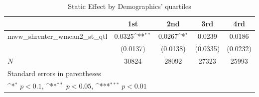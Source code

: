 \begin{table}[htbp]\centering
\def\sym#1{\ifmmode^{#1}\else\(^{#1}\)\fi}
\caption{Static Effect by Demographics' quartiles}
\begin{tabular}{l*{4}{c}}
\hline\hline
            &\multicolumn{1}{c}{1st}&\multicolumn{1}{c}{2nd}&\multicolumn{1}{c}{3rd}&\multicolumn{1}{c}{4rd}\\
\hline
mww\_shrenter\_wmean2\_st\_qtl&      0.0325\sym{**} &      0.0267\sym{*}  &      0.0239         &      0.0186         \\
            &    (0.0137)         &    (0.0138)         &    (0.0335)         &    (0.0232)         \\
\hline
\(N\)       &       30824         &       28092         &       27323         &       25993         \\
\hline\hline
\multicolumn{5}{l}{\footnotesize Standard errors in parentheses}\\
\multicolumn{5}{l}{\footnotesize \sym{*} \(p<0.1\), \sym{**} \(p<0.05\), \sym{***} \(p<0.01\)}\\
\end{tabular}
\end{table}
